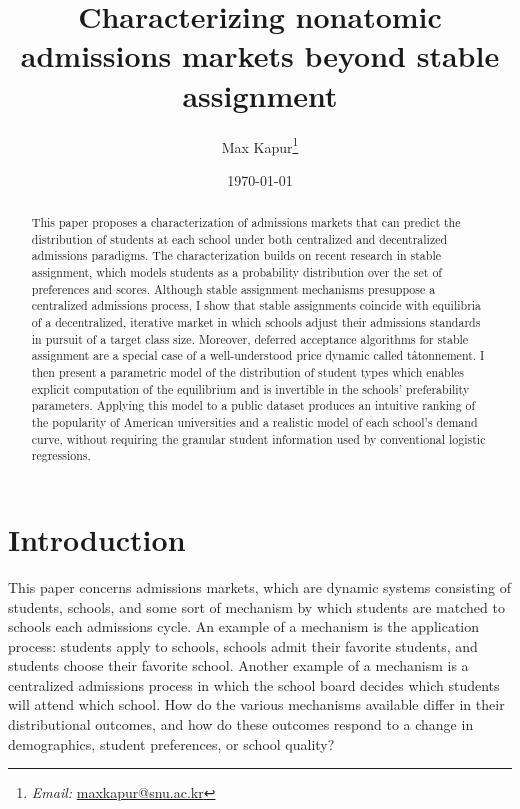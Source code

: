 \documentclass[12pt]{article}
\theoremstyle{definition}
\begin{document}
\title{Characterizing nonatomic admissions markets beyond stable assignment}
\date{\today}
\author{Max Kapur\footnote{\emph{Email:} \href{mailto:maxkapur@snu.ac.kr}{maxkapur@snu.ac.kr}}}



\maketitle

\begin{abstract}
This paper proposes a characterization of admissions markets that can predict the distribution of students at each school under both centralized and decentralized admissions paradigms. The characterization builds on recent research in stable assignment, which models students as a probability distribution over the set of preferences and scores. Although stable assignment mechanisms presuppose a centralized admissions process, I show that stable assignments coincide with equilibria of a decentralized, iterative market in which schools adjust their admissions standards in pursuit of a target class size. Moreover, deferred acceptance algorithms for stable assignment are a special case of a well-understood price dynamic called t\^{a}tonnement. I then present a parametric model of the distribution of student types which enables explicit computation of the equilibrium and is invertible in the schools' preferability parameters. Applying this model to a public dataset produces an intuitive ranking of the popularity of American universities and a realistic model of each school's demand curve, without requiring the granular student information used by conventional logistic regressions.
\end{abstract}

\pagebreak
\tableofcontents

\pagebreak
\section{Introduction}
This paper concerns admissions markets, which are dynamic systems consisting of students, schools, and some sort of mechanism by which students are matched to schools each admissions cycle. An example of a mechanism is the application process: students apply to schools, schools admit their favorite students, and students choose their favorite school. Another example of a mechanism is a centralized admissions process in which the school board decides which students will attend which school. How do the various mechanisms available differ in their distributional outcomes, and how do these outcomes respond to a change in demographics, student preferences, or school quality?
\end{document}
